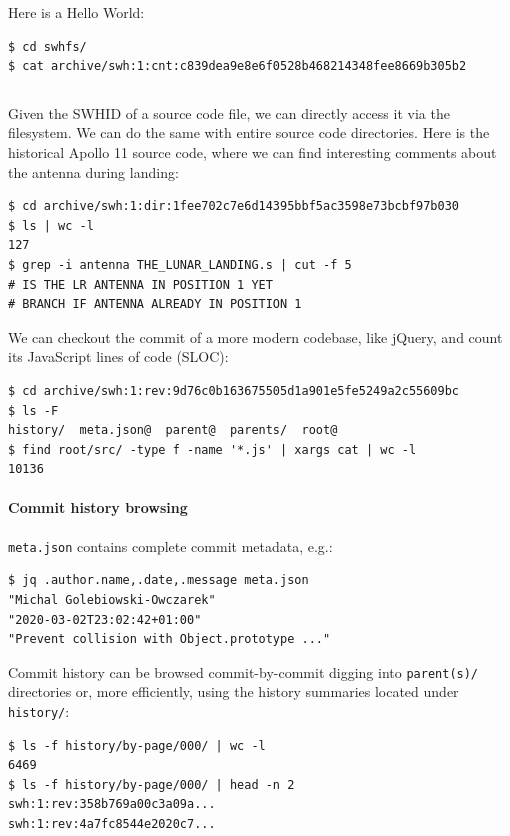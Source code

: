 Here is a \SWHFS{} Hello World:

\begin{verbatim}
$ cd swhfs/
$ cat archive/swh:1:cnt:c839dea9e8e6f0528b468214348fee8669b305b2
\end{verbatim}
\inputminted{c}{codesamples/swh-fuse/hello.c}

Given the SWHID of a source code file, we can directly access it via the
filesystem. We can do the same with entire source code directories. Here is the
historical Apollo 11 source code, where we can find interesting comments about
the antenna during landing:

\begin{verbatim}
$ cd archive/swh:1:dir:1fee702c7e6d14395bbf5ac3598e73bcbf97b030
$ ls | wc -l
127
$ grep -i antenna THE_LUNAR_LANDING.s | cut -f 5
# IS THE LR ANTENNA IN POSITION 1 YET
# BRANCH IF ANTENNA ALREADY IN POSITION 1
\end{verbatim}

We can checkout the commit of a more modern codebase, like jQuery, and count
its JavaScript lines of code (SLOC):

\begin{verbatim}
$ cd archive/swh:1:rev:9d76c0b163675505d1a901e5fe5249a2c55609bc
$ ls -F
history/  meta.json@  parent@  parents/  root@
$ find root/src/ -type f -name '*.js' | xargs cat | wc -l
10136
\end{verbatim}

\paragraph{Commit history browsing}

\texttt{meta.json} contains complete commit metadata, e.g.:

\begin{verbatim}
$ jq .author.name,.date,.message meta.json
"Michal Golebiowski-Owczarek"
"2020-03-02T23:02:42+01:00"
"Prevent collision with Object.prototype ..."
\end{verbatim}

Commit history can be browsed commit-by-commit digging into \texttt{parent(s)/}
directories or, more efficiently, using the history summaries located under
\texttt{history/}:

\begin{verbatim}
$ ls -f history/by-page/000/ | wc -l
6469
$ ls -f history/by-page/000/ | head -n 2
swh:1:rev:358b769a00c3a09a...
swh:1:rev:4a7fc8544e2020c7...
\end{verbatim}

